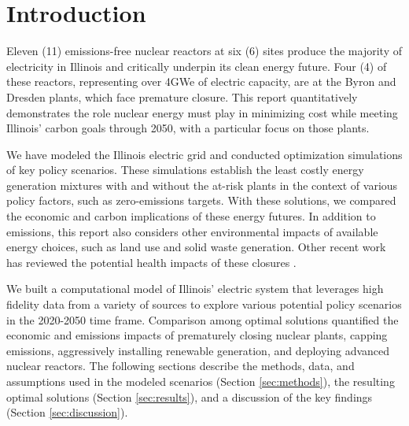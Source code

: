 \section{Introduction}\label{sec:intro}
Eleven (11) emissions-free nuclear reactors at six (6) sites produce the majority of
electricity in Illinois and critically underpin its clean energy future. Four 
(4) of these reactors, representing over 4GWe of electric capacity, are at the Byron 
and Dresden plants, which face premature closure. This
report quantitatively demonstrates the role nuclear energy must play in
minimizing cost while meeting Illinois’ carbon goals through 2050, with a 
particular focus on those plants. 

We have 
modeled the Illinois electric grid and conducted optimization simulations of 
key policy scenarios. These simulations establish the least costly energy 
generation mixtures with and without the at-risk plants in the context of 
various policy factors, such as zero-emissions targets. 
With these solutions, we compared the economic and carbon implications of these energy futures. 
In addition to emissions, this report also considers
other environmental impacts of available energy choices, such as land use and
solid waste generation. Other recent work has reviewed the potential health 
impacts of these closures \cite{catf_potential_2021}.

We built a computational model of Illinois' electric system that leverages high 
fidelity data from a variety of sources to explore various potential policy 
scenarios in the 2020-2050 time frame.  Comparison among optimal solutions 
quantified the economic and emissions impacts of prematurely closing nuclear 
plants, capping emissions, aggressively installing renewable generation, and 
deploying advanced nuclear reactors.  The following sections describe the 
methods, data, and assumptions used in the modeled scenarios (Section 
\ref{sec:methods}), the resulting optimal solutions (Section 
\ref{sec:results}), and a discussion of the key findings (Section 
\ref{sec:discussion}).  

